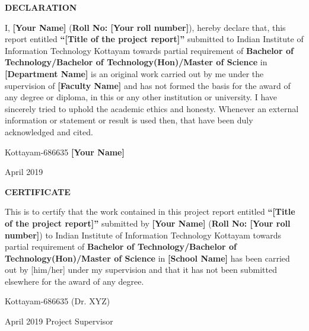 \documentclass[12pt,a4wide]{report}
\theoremstyle{plain}
\theoremstyle{definition}
\theoremstyle{remark}
\begin{document}
\clearpage
 \setcounter{page}{2}
\begin{center}
{\large{\bf{DECLARATION}}}
\end{center}


\noindent I, \textbf{[Your Name]} (\textbf{Roll No: [Your roll
number]}), hereby declare that, this report entitled
\textbf{``[Title of the project report]''} submitted to Indian
Institute of Information Technology Kottayam towards partial
requirement of {\bf Bachelor of Technology/Bachelor of
Technology(Hon)/Master of Science} in \textbf{[Department  Name]}
is an original work carried out by me under the supervision of
\textbf{[Faculty Name]} and has not formed the basis for the award
of any degree or diploma, in this or any other institution or
university. I have sincerely tried to uphold the academic ethics
and honesty. Whenever an external information or statement or
result is used then, that have been duly acknowledged and cited.

\vspace{4cm}

\noindent Kottayam-686635 \hfill \textbf{[Your Name]}

\noindent April  2019

\clearpage


 \setcounter{page}{3}
\begin{center}
{\large{\bf{CERTIFICATE}}}
\end{center}


\noindent This is to certify that the work contained in this
project report entitled \textbf{``[Title of the project report]''}
submitted by \textbf{[Your Name]} (\textbf{Roll No: [Your roll
number]}) to Indian Institute of Information Technology Kottayam
towards partial requirement of {\bf Bachelor of
Technology/Bachelor of Technology(Hon)/Master of Science} in
\textbf{[School Name]} has been carried out by [him/her] under my
supervision and that it has not been submitted elsewhere for the
award of any degree.


\vspace{4cm}

\noindent Kottayam-686635  \hfill (Dr. XYZ)

\noindent April  2019 \hfill Project Supervisor

\clearpage
\end{document}
